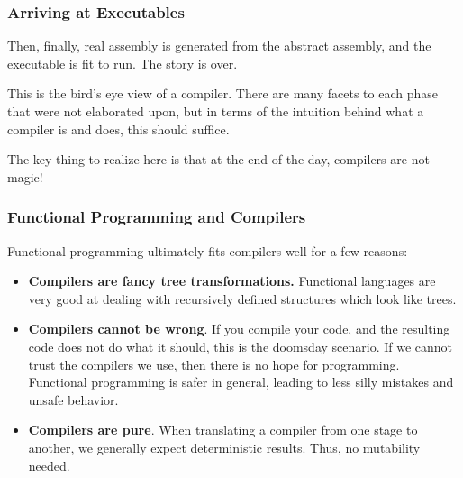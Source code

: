 \documentclass[aspectratio=169, handout]{beamer}
\begin{document}
\begin{frame}[fragile]
  \frametitle{Arriving at Executables}

  Then, finally, real assembly is generated from the abstract assembly, and
  the executable is fit to run. The story is over.

  \pause
  \vspace{\fill}

  This is the bird's eye view of a compiler. There are many facets to each
  phase that were not elaborated upon, but in terms of the intuition behind
  what a compiler is and does, this should suffice.

  \pause
  \vspace{\fill}

  The key thing to realize here is that at the end of the day, compilers are
  not magic!
\end{frame}

\begin{frame}[fragile]
  \frametitle{Functional Programming and Compilers}

  Functional programming ultimately fits compilers well for a few reasons:
  \pause
  \begin{itemize}
    \item \textbf{Compilers are fancy tree transformations.} Functional languages
    are very good at dealing with recursively defined structures which look like
    trees. \pause
    \item \textbf{Compilers cannot be wrong}. If you compile your code, and the
    resulting code does not do what it should, this is the doomsday scenario. If
    we cannot trust the compilers we use, then there is no hope for programming.
    Functional programming is safer in general, leading to less silly mistakes and
    unsafe behavior. \pause
    \item \textbf{Compilers are pure}. When translating a compiler from one
    stage to another, we generally expect deterministic results. Thus, no
    mutability needed.
  \end{itemize}
\end{frame}

\end{document}
